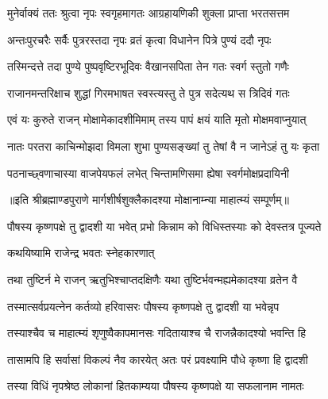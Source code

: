 \twolineshloka
{मुनेर्वाक्यं ततः श्रुत्वा नृपः स्वगृहमागतः}
{आग्रहायणिकी शुक्ला प्राप्ता भरतसत्तम} %

\twolineshloka
{अन्तःपुरचरैः सर्वैः पुत्ररस्तदा नृपः}
{व्रतं कृत्वा विधानेन पित्रे पुण्यं ददौ नृपः} %

\twolineshloka
{तस्मिन्दत्ते तदा पुण्ये पुष्पवृष्टिरभूदिवः}
{वैखानसपिता तेन गतः स्वर्ग स्तुतो गणैः} %

\twolineshloka
{राजानमन्तरिक्षाच शुद्धां गिरमभाषत}
{स्वस्त्यस्तु ते पुत्र सदेत्यथ स त्रिदिवं गतः} %

\twolineshloka
{एवं यः कुरुते राजन् मोक्षामेकादशीमिमाम्}
{तस्य पापं क्षयं याति मृतो मोक्षमवाप्नुयात्} %

\twolineshloka
{नातः परतरा काचिन्मोझदा विमला शुभा}
{पुण्यसङ्ख्यां तु तेषां वै न जानेऽहं तु यः कृता} %

\twolineshloka
{पठनाच्छ्वणाचास्या वाजपेयफलं लभेत्}
{चिन्तामणिसमा ह्येषा स्वर्गमोक्षप्रदायिनी} %

॥इति श्रीब्रह्माण्डपुराणे मार्गशीर्षशुक्लैकादश्या मोक्षानाम्न्या माहात्म्यं सम्पूर्णम्॥


\hyperref[sec:ekadashi_mahatmyam_vrata_raja]{\closesub}
\clearpage

\label{sec:vrata-raja-pausha-krishna-saphala}


\twolineshloka
{पौषस्य कृष्णपक्षे तु द्वादशी या भवेत् प्रभो}
{किन्नाम को विधिस्तस्याः को देवस्तत्र पूज्यते} %



\onelineshloka
{कथयिष्यामि राजेन्द्र भवतः स्नेहकारणात्} %

\twolineshloka
{तथा तुष्टिर्न मे राजन् ऋतुभिश्चाप्तदक्षिणैः}
{यथा तुष्टिर्भवन्मह्यमेकादश्या व्रतेन वै} %

\twolineshloka
{तस्मात्सर्वप्रयत्नेन कर्तव्यो हरिवासरः}
{पौषस्य कृष्णपक्षे तु द्वादशी या भवेन्नृप} %

\twolineshloka
{तस्याश्चैव च माहात्म्यं शृणुष्वैकापमानसः}
{गदितायाश्च चै राजन्नैकादश्यो भवन्ति हि} %

\twolineshloka
{तासामपि हि सर्वासां विकल्पं नैव कारयेत्}
{अतः परं प्रवक्ष्यामि पौधे कृष्णा हि द्वादशी} %

\twolineshloka
{तस्या विधिं नृपश्रेष्ठ लोकानां हितकाम्यया}
{पौषस्य कृष्णपक्षे या सफलानाम नामतः} %

